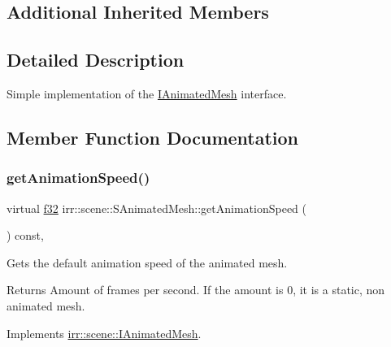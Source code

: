 \subsection*{Additional Inherited Members}


\subsection{Detailed Description}
Simple implementation of the \hyperlink{classirr_1_1scene_1_1IAnimatedMesh}{I\+Animated\+Mesh} interface. 

\subsection{Member Function Documentation}
\mbox{\label{structirr_1_1scene_1_1SAnimatedMesh_aa6b6302dad72761e22ba10cc4486b4c8}} 
\subsubsection{\texorpdfstring{get\+Animation\+Speed()}{getAnimationSpeed()}\hspace{0.1cm}{\footnotesize\ttfamily [1/2]}}
{\footnotesize\ttfamily virtual \hyperlink{namespaceirr_a0277be98d67dc26ff93b1a6a1d086b07}{f32} irr\+::scene\+::\+S\+Animated\+Mesh\+::get\+Animation\+Speed (\begin{DoxyParamCaption}{ }\end{DoxyParamCaption}) const\hspace{0.3cm}{\ttfamily [inline]}, {\ttfamily [virtual]}}



Gets the default animation speed of the animated mesh. 

\begin{DoxyReturn}{Returns}
Amount of frames per second. If the amount is 0, it is a static, non animated mesh. 
\end{DoxyReturn}


Implements \hyperlink{classirr_1_1scene_1_1IAnimatedMesh_acb4249295319c8240d5bedc167417435}{irr\+::scene\+::\+I\+Animated\+Mesh}.

\mbox{\label{structirr_1_1scene_1_1SAnimatedMesh_aa6b6302dad72761e22ba10cc4486b4c8}} 

